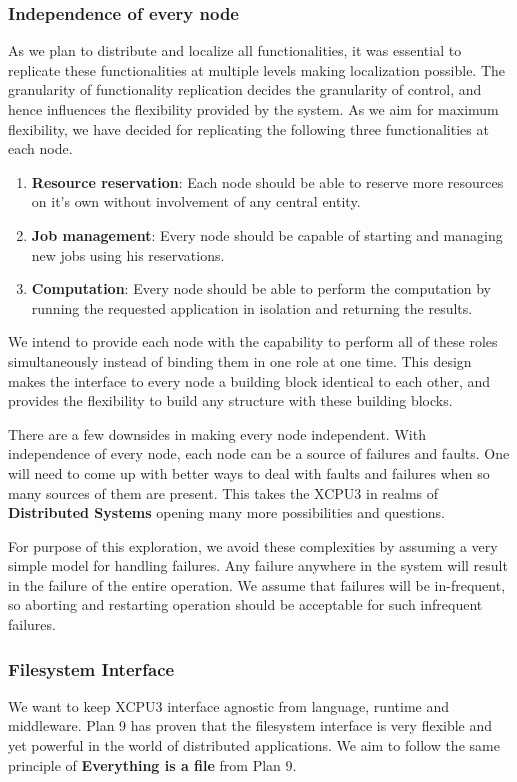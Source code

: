\documentclass[conference]{IEEEtran}
\begin{document}
\subsubsection{Independence of every node}
As we plan to distribute and localize all functionalities, it was essential to
replicate these functionalities at multiple levels making localization
possible.  The granularity of functionality replication decides the granularity of control,
and hence influences the flexibility provided by the system.  As we aim for 
maximum flexibility, we have decided for replicating the following three
functionalities at each node.
\begin{enumerate}
\item \textbf{Resource reservation}: Each node should be able to reserve more
resources on it's own without involvement of any central entity.

\item \textbf{Job management}: Every node should be capable of starting and
managing new jobs using his reservations.

\item \textbf{Computation}: Every node should be able to perform the
computation by running the requested application in isolation and returning
the results.
\end{enumerate}

We intend to provide each node with the capability to perform all of these roles
simultaneously instead of binding them in one role at one time.  This design
makes the interface to every node a building block identical to each other, 
and provides the flexibility to build any structure with these building blocks.

There are a few downsides in making every node independent.  With independence
of every node, each node can be a source of failures and faults.
One will need to come up with better ways to deal with faults and
failures when so many sources of them are present.  This takes the XCPU3 in
realms of \textbf{Distributed Systems} opening many more possibilities and
questions.

For purpose of this exploration, we avoid these complexities by assuming a very
simple model for handling failures.  Any failure anywhere in the system will
result in the failure of the entire operation.  We assume that failures will
be in-frequent, so aborting and restarting operation should be acceptable for
such infrequent failures.

\subsubsection{Filesystem Interface}
We want to keep XCPU3 interface agnostic from language, runtime and middleware.
Plan 9 has proven that the filesystem interface is very flexible and yet
powerful in the world of distributed applications.  We aim to follow the same
principle of \textbf{Everything is a file} from Plan 9.
\end{document}
